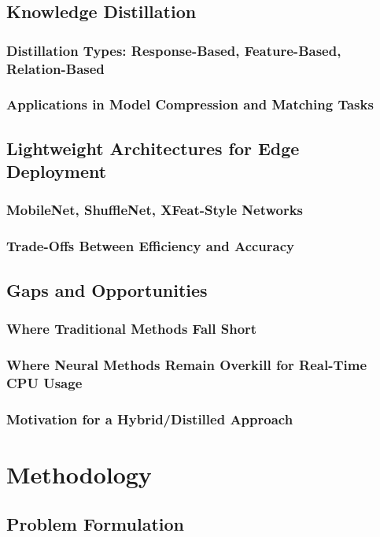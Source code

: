 \documentclass[a4paper,12pt]{report}
\begin{document}
\section{Knowledge Distillation}
\subsection{Distillation Types: Response-Based, Feature-Based, Relation-Based}
\subsection{Applications in Model Compression and Matching Tasks}

\section{Lightweight Architectures for Edge Deployment}
\subsection{MobileNet, ShuffleNet, XFeat-Style Networks}
\subsection{Trade-Offs Between Efficiency and Accuracy}

\section{Gaps and Opportunities}
\subsection{Where Traditional Methods Fall Short}
\subsection{Where Neural Methods Remain Overkill for Real-Time CPU Usage}
\subsection{Motivation for a Hybrid/Distilled Approach}

\chapter{Methodology}
\section{Problem Formulation}
\end{document}
